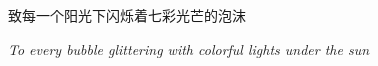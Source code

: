 \vspace*{\fill}
\begin{center}
    \Large 致每一个阳光下闪烁着七彩光芒的泡沫

    \vspace{2ex}

    \large \textit{To every bubble glittering with colorful lights under the sun}
\end{center}
\vspace*{\fill}
